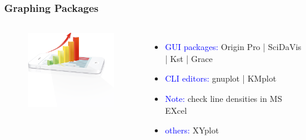 \documentclass[newPxFont,sthlmFooter]{beamer}
\newcommand{\fs}{\footnotesize}
\begin{document}
\begin{frame}\frametitle{Graphing Packages}
  \begin{columns}[T,onlytextwidth]
              \vspace{1cm}
  \begin{figure}
    \centering
    \includegraphics[width=2in]{figs/gps} 
  \end{figure}
          \vspace{1cm}
  \begin{itemize}
  \fs
	\item \textcolor{blue}{GUI packages:} Origin Pro | SciDaVis | Kst | Grace
	\item \textcolor{blue}{CLI editors:} gnuplot | KMplot
	\item \textcolor{blue}{Note:} check line densities in MS EXcel
	\item \textcolor{blue}{others:} XYplot
	\end{itemize}
  \vspace{-2cm}
  \end{columns}
\end{frame}
\end{document}
